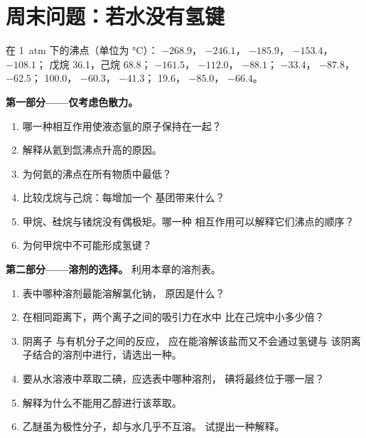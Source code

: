 \section{周末问题：若水没有氢键}

\begin{problem}
\label{pb:b1:intermolecular-forces-solvents:1}
在 \qty{1}{atm} 下的沸点（单位为 \unit{\celsius}）： $-268.9$，
 $-246.1$， $-185.9$， $-153.4$， $-108.1$；
戊烷 36.1，己烷 68.8； $-161.5$， $-112.0$，
 $-88.1$； $-33.4$， $-87.8$， $-62.5$；
 100.0， $-60.3$， $-41.3$； 19.6，
 $-85.0$， $-66.4$。

\medskip
\noindent\textbf{第一部分——仅考虑色散力。}
\begin{enumerate}
  \item 哪一种相互作用使液态氩的原子保持在一起？
  \item 解释从氦到氙沸点升高的原因。
  \item 为何氦的沸点在所有物质中最低？
  \item 比较戊烷与己烷：每增加一个  基团带来什么？
  \item 甲烷、硅烷与锗烷没有偶极矩。哪一种
        相互作用可以解释它们沸点的顺序？
  \item 为何甲烷中不可能形成氢键？
\end{enumerate}

\medskip
\noindent\textbf{第二部分——溶剂的选择。}
利用本章的溶剂表。
\begin{enumerate}[resume]
  \item 表中哪种溶剂最能溶解氯化钠，
        原因是什么？
  \item 在相同距离下，两个离子之间的吸引力在水中
        比在己烷中小多少倍？
  \item 阴离子  与有机分子之间的反应，
        应在能溶解该盐而又不会通过氢键与
        该阴离子结合的溶剂中进行，请选出一种。
  \item 要从水溶液中萃取二碘，应选表中哪种溶剂，
        碘将最终位于哪一层？
  \item 解释为什么不能用乙醇进行该萃取。
  \item 乙醚虽为极性分子，却与水几乎不互溶。
        试提出一种解释。
\end{enumerate}


\end{problem}

